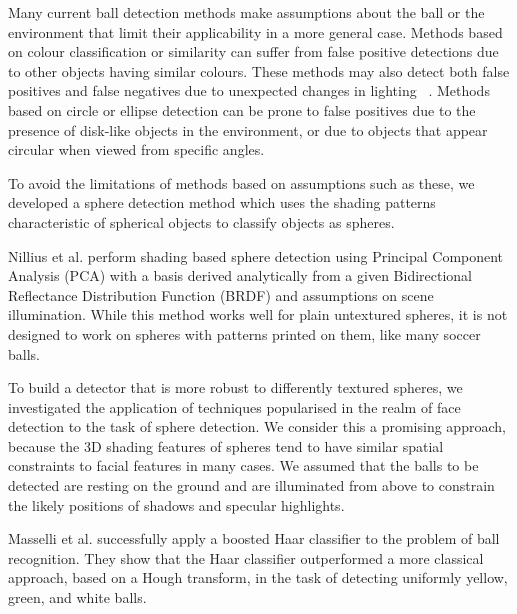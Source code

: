 \documentclass{sig-alternate-05-2015}
\newcommand{\citep}[1]{\cite{#1}}
\newcommand{\citet}[1]{\cite{#1}}
\begin{document}
{		Many current ball detection methods make assumptions about the ball or the environment that limit their applicability in a more general case. Methods based on colour classification or similarity can suffer from false positive detections due to other objects having similar colours. These methods may also detect both false positives and false negatives due to unexpected changes in lighting ~\citep{HendersonEtAl2008}. Methods based on circle or ellipse detection can be prone to false positives due to the presence of disk-like objects in the environment, or due to objects that appear circular when viewed from specific angles.

		To avoid the limitations of methods based on assumptions such as these, we developed a sphere detection method which uses the shading patterns characteristic of spherical objects to classify objects as spheres.

		Nillius et al. \citet{nillius2008shading} perform shading based sphere detection using Principal Component Analysis (PCA) with a basis derived analytically from a given Bidirectional Reflectance Distribution Function (BRDF) and assumptions on scene illumination. While this method works well for plain untextured spheres, it is
		not designed to work on spheres with patterns printed on them, like many soccer balls.
		
		
		
		
		


		To build a detector that is more robust to differently textured spheres, we investigated the application of techniques popularised in the realm of face detection to the task of sphere detection. We consider this a promising approach, because the 3D shading features of spheres tend to have similar spatial constraints to facial features in many cases. We assumed that the balls to be detected are resting on the ground and are illuminated from above to constrain the likely positions of shadows and specular highlights.



		Masselli et al. \citet{masselli2013haar} successfully apply a boosted Haar classifier \citep{viola2001robust} to the problem of ball recognition. They show that the Haar classifier outperformed a more classical approach, based on a Hough transform, in the task of detecting uniformly yellow, green, and white balls.

}
\end{document}
